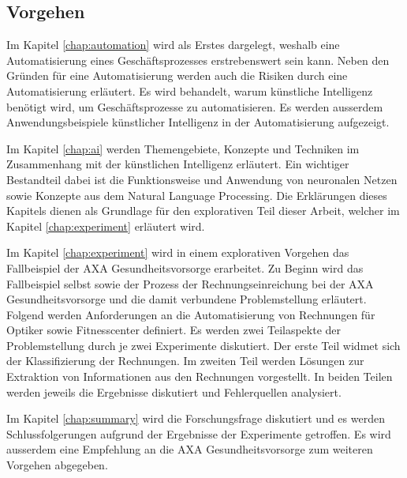


\subsection{Vorgehen}

Im Kapitel \ref{chap:automation} wird als Erstes dargelegt, weshalb eine Automatisierung eines Geschäftsprozesses erstrebenswert sein kann. Neben den Gründen für eine Automatisierung werden auch die Risiken durch eine Automatisierung erläutert. Es wird behandelt, warum künstliche Intelligenz benötigt wird, um Geschäftsprozesse zu automatisieren. Es werden ausserdem Anwendungsbeispiele künstlicher Intelligenz in der Automatisierung aufgezeigt.

Im Kapitel \ref{chap:ai} werden Themengebiete, Konzepte und Techniken im Zusammenhang mit der künstlichen Intelligenz erläutert. Ein wichtiger Bestandteil dabei ist die Funktionsweise und Anwendung von neuronalen Netzen sowie Konzepte aus dem Natural Language Processing. Die Erklärungen dieses Kapitels dienen als Grundlage für den explorativen Teil dieser Arbeit, welcher im Kapitel \ref{chap:experiment} erläutert wird.

Im Kapitel \ref{chap:experiment} wird in einem explorativen Vorgehen das Fallbeispiel der AXA Gesundheitsvorsorge erarbeitet. Zu Beginn wird das Fallbeispiel selbst sowie der Prozess der Rechnungseinreichung bei der AXA Gesundheitsvorsorge und die damit verbundene Problemstellung erläutert. Folgend werden Anforderungen an die Automatisierung von Rechnungen für Optiker sowie Fitnesscenter definiert. Es werden zwei Teilaspekte der Problemstellung durch je zwei Experimente diskutiert. Der erste Teil widmet sich der Klassifizierung der Rechnungen. Im zweiten Teil werden Lösungen zur Extraktion von Informationen aus den Rechnungen vorgestellt. In beiden Teilen werden jeweils die Ergebnisse diskutiert und Fehlerquellen analysiert. 

Im Kapitel \ref{chap:summary} wird die Forschungsfrage diskutiert und es werden Schlussfolgerungen aufgrund der Ergebnisse der Experimente getroffen. Es wird ausserdem eine Empfehlung an die AXA Gesundheitsvorsorge zum weiteren Vorgehen abgegeben.

